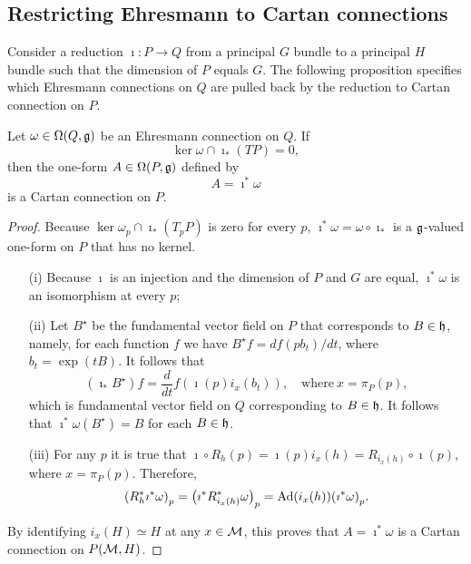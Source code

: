 \documentclass[
final,
11pt,
a4paper,
DIV=11,
headinclude=true,
footinclude=false,
bibliography=totoc,
twoside=true,  %
BCOR=5mm
]{scrbook}
\begin{document}
\subsection{Restricting Ehresmann to Cartan connections}

Consider a reduction $\imath : P \to Q$ from a principal $G$ 
bundle to a principal $H$ bundle such that the dimension of $P$ 
equals $G$. The following proposition specifies which Ehresmann 
connections on $Q$ are pulled back by the reduction to Cartan 
connection on $P$.

\begin{proposition}
Let $\omega \in \Omega(Q,\mathfrak{g})$ be an Ehresmann 
connection on $Q$. If
\begin{equation}
\label{eq:cond_reduc_Cartan}
  \ker\omega \cap \imath_\ast(TP) = 0,
\end{equation}
then the one-form $A \in \Omega(P,\mathfrak{g})$ defined by
\begin{equation*}
  A = \imath^\ast\omega
\end{equation*}
is a Cartan connection on $P$.
\end{proposition}

\begin{proof}
Because $\ker\omega_p \cap \imath_\ast(T_p P)$ is zero for every 
$p$, $\imath^\ast\omega = \omega\circ\imath_\ast$ is 
a $\mathfrak{g}$-valued one-form on $P$ that has no kernel.
\begin{itemize}
  \item[(i)] Because $\imath$ is an injection and the dimension 
    of $P$ and $G$ are equal, $\imath^\ast\omega$ is an 
    isomorphism at every $p$;
  \item[(ii)] Let $B^\star$ be the fundamental vector field on 
    $P$ that corresponds to $B \in \mathfrak{h}$, namely, for each 
    function $f$ we have $B^\star f = df(p b_t)/dt$, where $b_t 
    = \exp(tB)$. It follows that
    \begin{equation*}
      (\imath_\ast B^\star) f
      = \frac{d}{dt} f(\imath(p) i_x(b_t)),
      \quad\text{where}~%
      x = \pi_P(p),
    \end{equation*}
    which is fundamental vector field on $Q$ corresponding to $B 
    \in \mathfrak{h}$. It follows that $\imath^\ast\omega(B^\star) = B$ 
    for each $B \in \mathfrak{h}$.
  \item[(iii)] For any $p$ it is true that $\imath \circ R_h (p) 
    = \imath(p) i_x(h) = R_{i_x(h)} \circ \imath (p)$, where $x = 
    \pi_P(p)$. Therefore,
    \begin{equation*}
      {(R_h^* \imath^*\omega)}_{p}
      = {\big(\imath^* R_{i_x(h)}^* \omega\big)}_p
      = \operatorname{Ad}(i_x(h)) {(\imath^* \omega)}_p.
    \end{equation*}
\end{itemize}
By identifying $i_x(H) \simeq H$ at any $x \in \mathcal{M}$, this 
proves that $A = \imath^* \omega$ is a Cartan connection on 
$P(\mathcal{M},H)$.
\end{proof}
\end{document}
